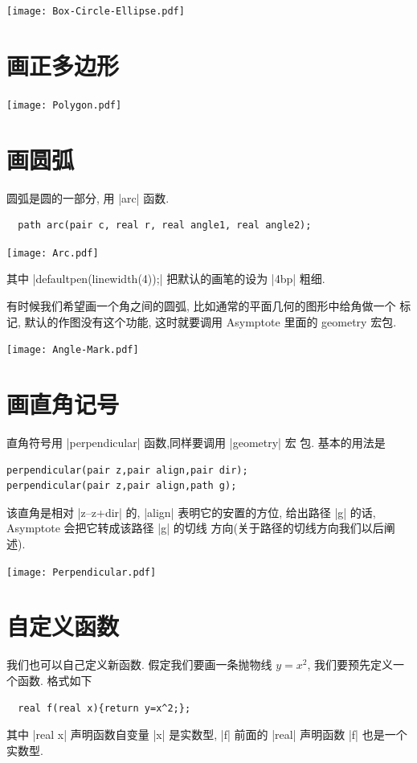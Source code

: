 \documentclass[nofonts,CJKnormalspaces]{ctexbook}
\begin{document}
\begin{center}\texttt{[image: Box-Circle-Ellipse.pdf]}\end{center}%


\section{画正多边形}
\begin{center}\texttt{[image: Polygon.pdf]}\end{center}%


\section{画圆弧}
圆弧是圆的一部分, 用 |arc| 函数.
\begin{lstlisting}
  path arc(pair c, real r, real angle1, real angle2);
\end{lstlisting}

\begin{center}\texttt{[image: Arc.pdf]}\end{center}%


其中 |defaultpen(linewidth(4));| 把默认的画笔的设为 |4bp| 粗细.

有时候我们希望画一个角之间的圆弧, 比如通常的平面几何的图形中给角做一个
标记, 默认的作图没有这个功能, 这时就要调用 Asymptote 里面的 geometry 宏包.
\begin{center}\texttt{[image: Angle-Mark.pdf]}\end{center}%


\section{画直角记号}
直角符号用 |perpendicular| 函数,同样要调用 |geometry| 宏
包. 基本的用法是
\begin{verbatim}
perpendicular(pair z,pair align,pair dir);
perpendicular(pair z,pair align,path g);
\end{verbatim}
该直角是相对 |z--z+dir| 的, |align| 表明它的安置的方位,
给出路径 |g| 的话, Asymptote 会把它转成该路径 |g| 的切线
方向(关于路径的切线方向我们以后阐述).
\begin{center}\texttt{[image: Perpendicular.pdf]}\end{center}%


\section{自定义函数}
我们也可以自己定义新函数. 假定我们要画一条抛物线 $y=x^{2}$, 我们要预先定义一个函数. 格式如下
\begin{lstlisting}
  real f(real x){return y=x^2;};
\end{lstlisting}
其中 |real x| 声明函数自变量 |x| 是实数型, |f| 前面的
|real| 声明函数 |f| 也是一个实数型.
\end{document}
